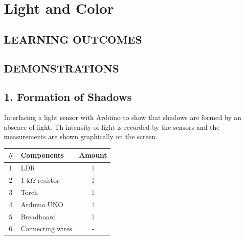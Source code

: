 \chapter{Light and Color}


\section*{LEARNING OUTCOMES}
{
\begin{center}
\end{center}
}

\section*{DEMONSTRATIONS}
\section*{1. Formation of Shadows}
Interfacing a light sensor with Arduino to show that shadows are formed by an absence of light. Th intensity of light is recorded by the sensors and the measurements are shown graphically on the screen.

\begin{table}[H]
    \centering
    \begin{tabular}{|c|l|c|}\hline
     \textbf{\#} & \textbf{Components} &  \textbf{Amount}\\\hline
    1 & LDR                     & 1\\\hline
    2 & 1 k$\Omega$ resistor    & 1\\\hline
    3 & Torch                   & 1\\ \hline
    4 & Arduino UNO             & 1 \\\hline
    5 & Breadboard              & 1 \\\hline
    6 & Connecting wires        & - \\\hline
    \end{tabular}
\end{table}

